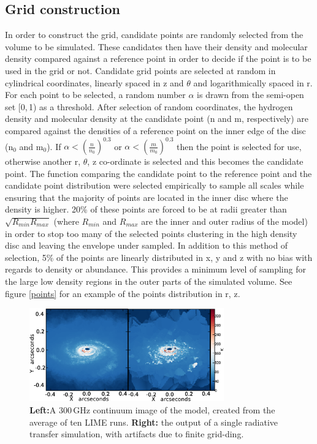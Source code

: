 \documentclass[useAMS,usenatbib]{mn2e}
\begin{document}
\subsection{Grid construction} \label{subsec:gridding}
In order to construct the grid, candidate points are randomly selected from the volume to be simulated. These candidates then have their density and molecular density compared against a reference point in order to decide if the point is to be used in the grid or not. Candidate grid points are selected at random in cylindrical coordinates, linearly spaced in z and $\theta$ and logarithmically spaced in r. For each point to be selected, a random number $\alpha$ is drawn from the semi-open set [0,$\,$1) as a threshold. After selection of random coordinates, the hydrogen density and molecular density at the candidate point (n and m, respectively) are compared against the densities of a reference point on the inner edge of the disc (n$_0$ and m$_0$). If $\alpha<\left( \frac{n}{n_0} \right)^{0.3}$ or $\alpha< \left( \frac{m}{m_0} \right)^{0.3}$ then the point is selected for use, otherwise another r, $\theta$, z co-ordinate is selected and this becomes the candidate point. The function comparing the candidate point to the reference point and the candidate point distribution were selected empirically to sample all scales while ensuring that the majority of points are located in the inner disc where the density is higher. 20\% of these points are forced to be at radii greater than $\sqrt{R_{min}R_{max}}$ (where $R_{min}$ and $R_{max}$ are the inner and outer radius of the model) in order to stop too many of the selected points clustering in the high density disc and leaving the envelope under sampled. In addition to this method of selection, 5\% of the points are linearly distributed in x, y and z with no bias with regards to density or abundance. This provides a minimum level of sampling for the large low density regions in the outer parts of the simulated volume. See figure \ref{points} for an example of the points distribution in r, z. \smallskip

\begin{figure}
 \includegraphics[width=84mm]{Figures/sim/continuum.eps}
 \caption{{\bf Left:}A 300$\,$GHz continuum image of the model, created from the average of ten LIME runs. {\bf Right:} the output of a single radiative transfer simulation, with artifacts due to finite grid-ding.}
 \label{averages}
\end{figure}
\end{document}

